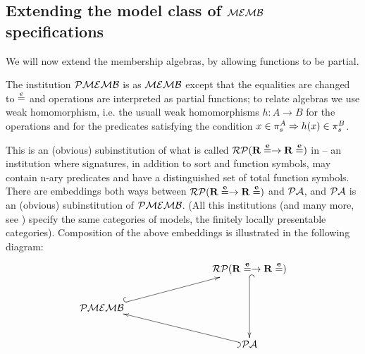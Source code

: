 \documentclass[10pt]{article}
\begin{document}
\subsection{Extending the model class of ${\mathcal{MEMB}}$ specifications}\label{sub:pamb}
We will now extend the membership algebras, by allowing
functions to be partial.
\begin{definition}
The institution ${\mathcal{PMEMB}}$ is as ${\mathcal{MEMB}}$ except that the equalities are
changed to $\stackrel{e}{=}$ and operations are interpreted as partial functions; to
relate algebras we use weak homomorphism, i.e. the usuall weak homomorphisms
$h:A\to B$ for the operations
and for the predicates satisfying the condition $x \in \pi_s^A \Rightarrow h(x)
\in \pi_s^B$.
\end{definition}
%
This is an (obvious) subinstitution of what is called ${{\mathcal{RP}}(\bf{R\stackrel{e}{=}\to R\stackrel{e}{=}})}$ in \cite{mossa} -- an institution where signatures, in addition
to sort and function symbols, may contain n-ary predicates and have a distinguished set
of total function symbols. There are embeddings both ways between
${{\mathcal{RP}}(\bf{R\stackrel{e}{=}\to R\stackrel{e}{=}})}$ and ${\mathcal{PA}}$, and ${\mathcal{PA}}$ is
an (obvious) subinstitution of ${\mathcal{PMEMB}}$. (All this institutions (and many
more, see \cite{mossa}) specify the same categories of models, the finitely
locally presentable categories). Composition of the above embeddings is
illustrated in the following diagram:
\[
\xymatrix{	&&& \inst{\inst{RP}(\bf{R\eeq \to R\eeq})} \ar@{^{(}->}[dd] \\
	\inst{PMEMB} \ar@{^{(}->}[rrru]\\ 
		&&& \inst{PA} \ar@{^{(}->}[lllu]\\
} 
\] 
\end{document}
